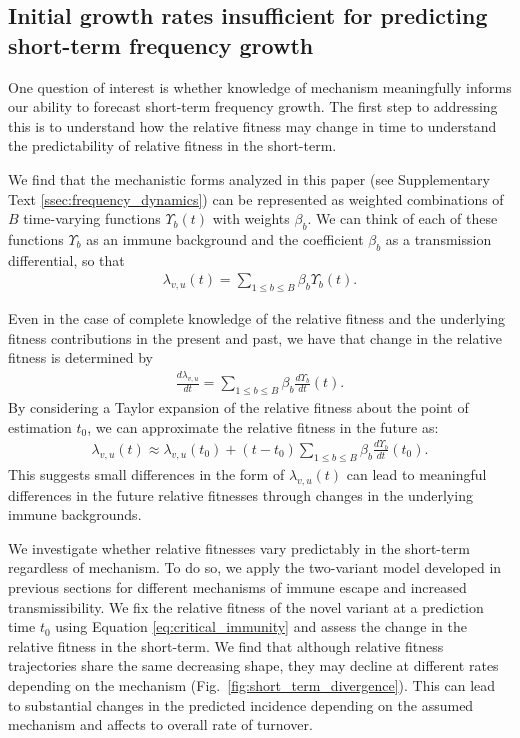 \documentclass[11pt,oneside,letterpaper]{article}
\begin{document}
\subsection*{Initial growth rates insufficient for predicting short-term frequency growth}

One question of interest is whether knowledge of mechanism meaningfully informs our ability to forecast short-term frequency growth.
The first step to addressing this is to understand how the relative fitness may change in time to understand the predictability of relative fitness in the short-term.

We find that the mechanistic forms analyzed in this paper (see Supplementary Text \ref{ssec:frequency_dynamics}) can be represented as weighted combinations of $B$ time-varying functions $\Upsilon_{b}(t)$ with weights $\beta_{b}$.
We can think of each of these functions $\Upsilon_b$ as an immune background and the coefficient $\beta_{b}$ as a transmission differential, so that
\begin{align*}
\lambda_{v,u}(t) = \sum_{1 \leq b \leq B} \beta_{b} \Upsilon_{b}(t).
\end{align*}

Even in the case of complete knowledge of the relative fitness and the underlying fitness contributions in the present and past, we have that change in the relative fitness is determined by
\begin{align*}
    \frac{d\lambda_{v,u}}{dt} = \sum_{1 \leq b \leq B} \beta_{b} \frac{d\Upsilon_{b}}{dt}(t).
\end{align*}
By considering a Taylor expansion of the relative fitness about the point of estimation $t_{0}$, we can approximate the relative fitness in the future as:
\begin{align*}
    \lambda_{v,u}(t) \approx \lambda_{v,u}(t_{0}) + (t - t_0)\sum_{1\leq b \leq B} \beta_b \frac{d\Upsilon_b}{dt}(t_0).
\end{align*}
This suggests small differences in the form of $\lambda_{v,u}(t)$ can lead to meaningful differences in the future relative fitnesses through changes in the underlying immune backgrounds.

We investigate whether relative fitnesses vary predictably in the short-term regardless of mechanism.
To do so, we apply the two-variant model developed in previous sections for different mechanisms of immune escape and increased transmissibility.
We fix the relative fitness of the novel variant at a prediction time $t_{0}$ using Equation \ref{eq:critical_immunity} and assess the change in the relative fitness in the short-term.
We find that although relative fitness trajectories share the same decreasing shape, they may decline at different rates depending on the mechanism (Fig.~\ref{fig:short_term_divergence}).
This can lead to substantial changes in the predicted incidence depending on the assumed mechanism and affects to overall rate of turnover.
\end{document}
